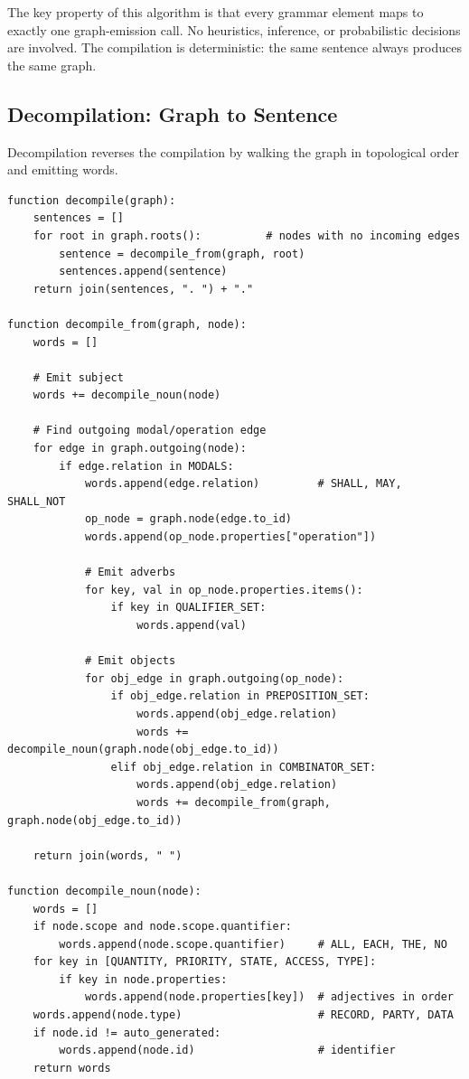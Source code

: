 \documentclass{article}
\begin{document}
The key property of this algorithm is that every grammar element maps to exactly one graph-emission call. No heuristics, inference, or probabilistic decisions are involved. The compilation is deterministic: the same sentence always produces the same graph.

\subsection{Decompilation: Graph to Sentence}

Decompilation reverses the compilation by walking the graph in topological order and emitting words.

\begin{lstlisting}[style=pseudocode]
function decompile(graph):
    sentences = []
    for root in graph.roots():          # nodes with no incoming edges
        sentence = decompile_from(graph, root)
        sentences.append(sentence)
    return join(sentences, ". ") + "."

function decompile_from(graph, node):
    words = []

    # Emit subject
    words += decompile_noun(node)

    # Find outgoing modal/operation edge
    for edge in graph.outgoing(node):
        if edge.relation in MODALS:
            words.append(edge.relation)         # SHALL, MAY, SHALL_NOT
            op_node = graph.node(edge.to_id)
            words.append(op_node.properties["operation"])

            # Emit adverbs
            for key, val in op_node.properties.items():
                if key in QUALIFIER_SET:
                    words.append(val)

            # Emit objects
            for obj_edge in graph.outgoing(op_node):
                if obj_edge.relation in PREPOSITION_SET:
                    words.append(obj_edge.relation)
                    words += decompile_noun(graph.node(obj_edge.to_id))
                elif obj_edge.relation in COMBINATOR_SET:
                    words.append(obj_edge.relation)
                    words += decompile_from(graph, graph.node(obj_edge.to_id))

    return join(words, " ")

function decompile_noun(node):
    words = []
    if node.scope and node.scope.quantifier:
        words.append(node.scope.quantifier)     # ALL, EACH, THE, NO
    for key in [QUANTITY, PRIORITY, STATE, ACCESS, TYPE]:
        if key in node.properties:
            words.append(node.properties[key])  # adjectives in order
    words.append(node.type)                     # RECORD, PARTY, DATA
    if node.id != auto_generated:
        words.append(node.id)                   # identifier
    return words
\end{lstlisting}
\end{document}
